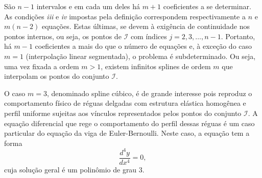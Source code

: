 São $n-1$ intervalos e em cada um deles há $m+1$ coeficientes a se determinar. As condições \textit{iii} e \textit{iv} impostas pela definição correspondem respectivamente a $n$ e $m(n-2)$ equações. Estas últimas, se devem à exigência de continuidade nos pontos internos, ou seja, os pontos de $\mathcal{I}$ com índices $j=2,3,\ldots,n-1$. Portanto, há $m-1$ coeficientes a mais do que o número de equações e, à exceção do caso $m=1$ (interpolação linear segmentada), o problema é subdeterminado. Ou seja, uma vez fixada a ordem $m>1$, existem infinitos splines de ordem $m$ que interpolam os pontos do conjunto $\mathcal{I}$.

O caso $m=3$, denominado spline cúbico, é de grande interesse pois reproduz o comportamento físico de réguas delgadas com estrutura elástica homogênea e perfil uniforme sujeitas aos vínculos representados pelos pontos  do conjunto $\mathcal{I}$. A equação diferencial que rege o comportamento do perfil dessas réguas é um caso particular do equação da viga de Euler-Bernoulli. Neste caso, a equação tem a forma
\begin{equation}\label{eq:ed-splin3}
\dfrac{d^4y}{dx^4}=0,
\end{equation}
cuja solução geral é um polinômio de grau 3.

